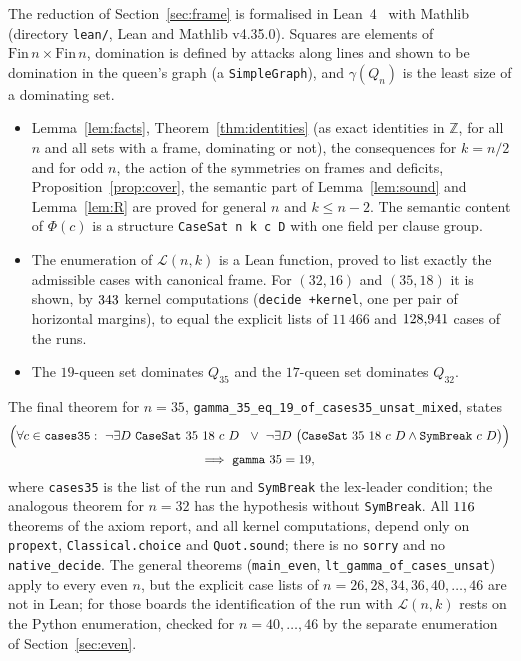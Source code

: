 \documentclass[11pt]{article}
\theoremstyle{definition}
\theoremstyle{remark}
\begin{document}
The reduction of Section~\ref{sec:frame} is formalised in Lean~4~\cite{Lean4} with Mathlib~\cite{Mathlib}
(directory \texttt{lean/}, Lean and Mathlib v4.35.0). Squares are elements of
$\mathrm{Fin}\,n\times\mathrm{Fin}\,n$, domination is defined by attacks along lines and shown to be
domination in the queen's graph (a \texttt{SimpleGraph}), and $\gamma(Q_n)$ is the least size of a
dominating set.
\begin{itemize}
\item Lemma~\ref{lem:facts}, Theorem~\ref{thm:identities} (as exact identities in $\mathbb Z$, for all
$n$ and all sets with a frame, dominating or not), the consequences for $k=n/2$ and for odd $n$, the
action of the symmetries on frames and deficits, Proposition~\ref{prop:cover}, the semantic part of
Lemma~\ref{lem:sound} and Lemma~\ref{lem:R} are proved for general $n$ and $k\le n-2$. The semantic
content of $\Phi(c)$ is a structure \texttt{CaseSat n k c D} with one field per clause group.
\item The enumeration of $\mathcal L(n,k)$ is a Lean function, proved to list exactly the admissible
cases with canonical frame. For $(32,16)$ and $(35,18)$ it is shown, by $343$ kernel
computations (\texttt{decide +kernel}, one per pair of horizontal margins), to equal the explicit
lists of $11\,466$ and $128{,}941$ cases of the runs.
\item The $19$-queen set dominates $Q_{35}$ and the $17$-queen set dominates $Q_{32}$.
\end{itemize}
The final theorem for $n=35$, \texttt{gamma\_35\_eq\_19\_of\_cases35\_unsat\_mixed}, states
\begin{multline*}
  \Bigl(\forall c\in\texttt{cases35}:\ \neg\exists D\ \texttt{CaseSat}\ 35\ 18\ c\ D\ \ \vee\
  \neg\exists D\ \bigl(\texttt{CaseSat}\ 35\ 18\ c\ D\wedge\texttt{SymBreak}\ c\ D\bigr)\Bigr)\\
  \Longrightarrow\ \texttt{gamma}\ 35=19,
\end{multline*}
where \texttt{cases35} is the list of the run and \texttt{SymBreak} the lex-leader condition; the
analogous theorem for $n=32$ has the hypothesis without \texttt{SymBreak}. All $116$ theorems
of the axiom report, and all kernel computations, depend only on \texttt{propext},
\texttt{Classical.choice} and \texttt{Quot.sound}; there is no \texttt{sorry} and no
\texttt{native\_decide}. The general theorems (\texttt{main\_even}, \texttt{lt\_gamma\_of\_cases\_unsat})
apply to every even $n$, but the explicit case lists of $n=26,28,34,36,40,\dots,46$ are not in Lean; for
those boards the identification of the run with $\mathcal L(n,k)$ rests on the Python enumeration, checked
for $n=40,\dots,46$ by the separate enumeration of Section~\ref{sec:even}.
\end{document}
